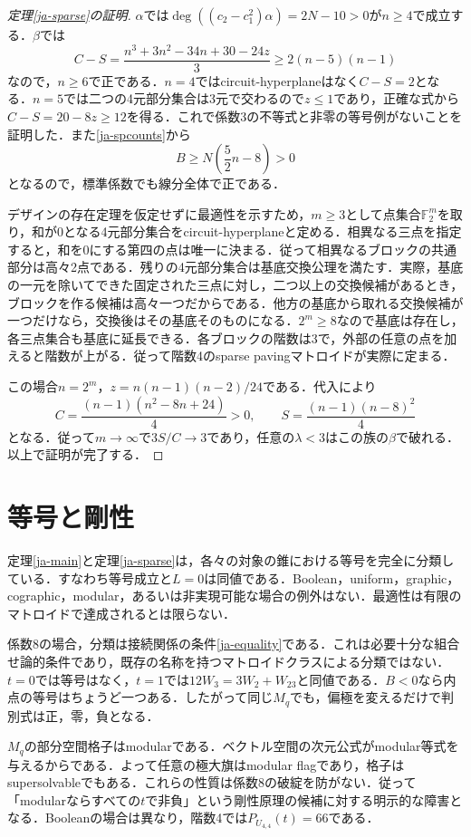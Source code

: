 \documentclass[12pt]{amsart}
\theoremstyle{definition}
\theoremstyle{remark}
\numberwithin{equation}{section}
\begin{document}
\begin{proof}[定理\ref{ja-sparse}の証明]
$\alpha$では$\deg((c_2-c_1^2)\alpha)=2N-10>0$が$n\geq4$で成立する．$\beta$では
\[
 C-S=\frac{n^3+3n^2-34n+30-24z}{3}
       \geq2(n-5)(n-1)
\]
なので，$n\geq6$で正である．$n=4$ではcircuit-hyperplaneはなく$C-S=2$となる．$n=5$では二つの4元部分集合は3元で交わるので$z\leq1$であり，正確な式から$C-S=20-8z\geq12$を得る．これで係数3の不等式と非零の等号例がないことを証明した．また\eqref{ja-spcounts}から
\[
 B\geq N\left(\frac52n-8\right)>0
\]
となるので，標準係数でも線分全体で正である．

デザインの存在定理を仮定せずに最適性を示すため，$m\geq3$として点集合$\mathbb F_2^m$を取り，和が0となる4元部分集合をcircuit-hyperplaneと定める．相異なる三点を指定すると，和を0にする第四の点は唯一に決まる．従って相異なるブロックの共通部分は高々2点である．残りの4元部分集合は基底交換公理を満たす．実際，基底の一元を除いてできた固定された三点に対し，二つ以上の交換候補があるとき，ブロックを作る候補は高々一つだからである．他方の基底から取れる交換候補が一つだけなら，交換後はその基底そのものになる．$2^m\geq8$なので基底は存在し，各三点集合も基底に延長できる．各ブロックの階数は3で，外部の任意の点を加えると階数が上がる．従って階数4のsparse pavingマトロイドが実際に定まる．

この場合$n=2^m$，$z=n(n-1)(n-2)/24$である．代入により
\[
 C=\frac{(n-1)(n^2-8n+24)}4>0,\qquad
 S=\frac{(n-1)(n-8)^2}4
\]
となる．従って$m\to\infty$で$3S/C\to3$であり，任意の$\lambda<3$はこの族の$\beta$で破れる．以上で証明が完了する．
\end{proof}

\section{等号と剛性}
定理\ref{ja-main}と定理\ref{ja-sparse}は，各々の対象の錐における等号を完全に分類している．すなわち等号成立と$L=0$は同値である．Boolean，uniform，graphic，cographic，modular，あるいは非実現可能な場合の例外はない．最適性は有限のマトロイドで達成されるとは限らない．

係数8の場合，分類は接続関係の条件\eqref{ja-equality}である．これは必要十分な組合せ論的条件であり，既存の名称を持つマトロイドクラスによる分類ではない．$t=0$では等号はなく，$t=1$では$12W_3=3W_2+W_{23}$と同値である．$B<0$なら内点の等号はちょうど一つある．したがって同じ$M_q$でも，偏極を変えるだけで判別式は正，零，負となる．

$M_q$の部分空間格子はmodularである．ベクトル空間の次元公式がmodular等式を与えるからである．よって任意の極大旗はmodular flagであり，格子はsupersolvableでもある．これらの性質は係数8の破綻を防がない．従って「modularならすべての$t$で非負」という剛性原理の候補に対する明示的な障害となる．Booleanの場合は異なり，階数4では$P_{U_{4,4}}(t)=66$である．
\end{document}
